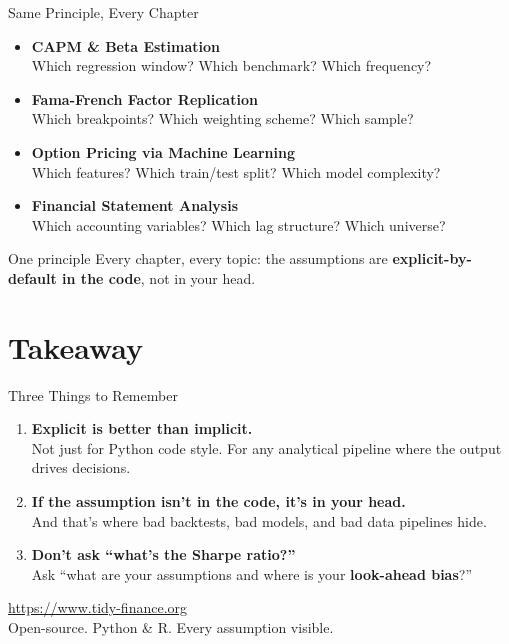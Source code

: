 \documentclass[10pt, xcolor={x11names,table},compress]{beamer}
\newcommand{\gtextb}[1]{ \textcolor{dgreen}{\textbf{#1}}}
\begin{document}
\begin{frame}{Same Principle, Every Chapter}

\begin{itemize}\small
    \item \textbf{CAPM \& Beta Estimation} \\ Which regression window? Which benchmark? Which frequency?
    \vspace{0.4em}
    \item \textbf{Fama-French Factor Replication} \\ Which breakpoints? Which weighting scheme? Which sample?
    \vspace{0.4em}
    \item \textbf{Option Pricing via Machine Learning} \\ Which features? Which train/test split? Which model complexity?
    \vspace{0.4em}
    \item \textbf{Financial Statement Analysis} \\ Which accounting variables? Which lag structure? Which universe?
\end{itemize}
\vfill
\begin{gbox}{One principle}
Every chapter, every topic: the assumptions are \textbf{explicit-by-default in the code}, not in your head.
\end{gbox}
\end{frame}
\section{Takeaway}
\begin{frame}{Three Things to Remember}
\begin{enumerate}\small
    \item \textbf{Explicit is better than implicit.}\\
    Not just for Python code style. For any analytical pipeline where the output drives decisions.
    \vspace{2em}
    \pause
    \item \textbf{If the assumption isn't in the code, it's in your head.}\\
    And that's where bad backtests, bad models, and bad data pipelines hide.
    \vspace{2em}
    \pause
    \item \textbf{Don't ask ``what's the Sharpe ratio?''}\\
    Ask ``what are your assumptions and where is your \gtextb{look-ahead bias}?''
\end{enumerate}
\end{frame}


\begin{frame}[plain]
\vspace*{2cm}
\begin{center}
{\Large\color{dblue}\url{https://www.tidy-finance.org}}\\[1.5em]
{\normalsize Open-source. Python \& R. Every assumption visible.}
\vspace{2em}
\end{center}
\end{frame}
\end{document}

